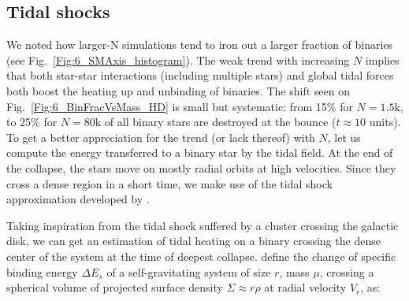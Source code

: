 \subsection{Tidal shocks} 
\label{Sec:6_tidal}


We noted how larger-N simulations tend to iron out a larger fraction of binaries (see Fig.~\ref{Fig:6_SMAxis_histogram}). 
The weak trend with increasing $N$ implies that both star-star interactions (including multiple stars) and global tidal forces both boost the heating up and unbinding of  binaries.  The shift seen on Fig.~\ref{Fig:6_BinFracVsMass_HD} is small but systematic: from 15\% for $N = 1.5$k, to 25\% for $N = 80$k of all binary stars are destroyed at the bounce ($t \approx 10 $ units).  To get a better appreciation for the trend (or lack thereof) with $N$, let us compute the energy transferred to a binary star by the tidal field. At the end of the collapse, the stars move on mostly radial orbits at high velocities. Since they cross a dense region in a short time, we make use of the tidal shock approximation developed by \citet[see also \citealt{Boily2004,BT}]{Spitzer1958}.


Taking inspiration from the tidal shock suffered  by a cluster crossing the galactic disk, we can get an estimation of tidal heating on a binary crossing the dense center of the system at the time of deepest collapse. \cite{BT} define the change of specific binding  energy $\Delta E_s $ of a self-gravitating system of size $r$, mass $\mu$, crossing a spherical volume of projected surface density $\Sigma \approx r \rho$ at radial velocity $V_r$, as:

